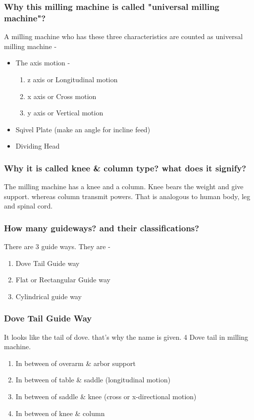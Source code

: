 \documentclass{article}
\begin{document}
\begin{multicols}{2}
\subsubsection*{Why this milling machine is called "universal milling machine"?}
A milling machine who has these three characteristics are counted as universal milling machine - 
\begin{itemize}
  \item The axis motion - 
    \begin{enumerate}
      \item z axis or Longitudinal motion 
      \item x axis or Cross motion 
      \item y axis or Vertical motion 
    \end{enumerate}
  \item Sqivel Plate (make an angle for incline feed)
  \item Dividing Head 
\end{itemize}

\subsubsection*{Why it is called knee \& column type? what does it signify?}
The milling machine has a knee and a column. Knee bears the weight and give support. whereas column transmit powers. That is analogous to human body, leg and spinal cord. 

\subsubsection*{How many guideways? and their classifications?}
There are 3 guide ways. They are - 
\begin{enumerate}
  \item Dove Tail Guide way
  \item Flat or Rectangular Guide way
  \item Cylindrical guide way  
\end{enumerate}

\subsubsection*{Dove Tail Guide Way}
It looks like the tail of dove. that's why the name is given.
4 Dove tail in milling machine. 
\begin{enumerate}
  \item In between of overarm \& arbor support 
  \item In between of table \& saddle (longitudinal motion)
  \item In between of saddle \& knee (cross or x-directional motion) 
  \item In between of knee \& column 
\end{enumerate}


\end{multicols}
\end{document}
